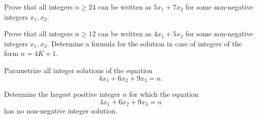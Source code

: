 \begin{exercise}\label{proof-cons-1}
Prove that all integers $n\geq 24$ can be written as $5x_1+7x_2$ for some non-negative integers $x_1,x_2$.
\end{exercise}

\begin{exercise}\label{proof-cons-2}
Prove that all integers $n\geq 12$ can be written as $4x_1+5x_2$ for some non-negative integers $x_1,x_2$.
Determine a formula for the solution in case of integers of the form $n=4K+1$.
\end{exercise}

\begin{exercise}\label{proof-cons-3}
Parametrize all integer solutions of the equation
$$
4x_1+6x_2+9x_3=n.
$$
\end{exercise}

\begin{exercise}\label{proof-cons-4}
Determine the largest positive integer $n$ for which the equation 
$$
4x_1+6x_2+9x_3=n
$$
has no non-negative integer solution.
\end{exercise}


